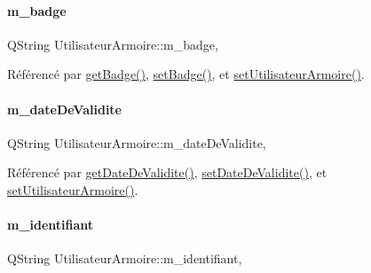 \paragraph{\texorpdfstring{m\+\_\+badge}{m\_badge}}
{\footnotesize\ttfamily Q\+String Utilisateur\+Armoire\+::m\+\_\+badge\hspace{0.3cm}{\ttfamily [read]}, {\ttfamily [write]}}



Référencé par \hyperlink{class_utilisateur_armoire_a22e301861ac1c932d47727ae02a17181}{get\+Badge()}, \hyperlink{class_utilisateur_armoire_afee7add8e43ae142c815f0d14491b01e}{set\+Badge()}, et \hyperlink{class_utilisateur_armoire_a523423ac9e15b8260ca7f5ffc84c008d}{set\+Utilisateur\+Armoire()}.

\mbox{\label{class_utilisateur_armoire_a51bd81c78d69ea2699373d820bae31e4}} 
\paragraph{\texorpdfstring{m\+\_\+date\+De\+Validite}{m\_dateDeValidite}}
{\footnotesize\ttfamily Q\+String Utilisateur\+Armoire\+::m\+\_\+date\+De\+Validite\hspace{0.3cm}{\ttfamily [read]}, {\ttfamily [write]}}



Référencé par \hyperlink{class_utilisateur_armoire_a83c5fad292be7c94e38fc14a5feeae7f}{get\+Date\+De\+Validite()}, \hyperlink{class_utilisateur_armoire_abe51b503b17f3d90c7ebe0546ed39cc0}{set\+Date\+De\+Validite()}, et \hyperlink{class_utilisateur_armoire_a523423ac9e15b8260ca7f5ffc84c008d}{set\+Utilisateur\+Armoire()}.

\mbox{\label{class_utilisateur_armoire_a30cb02e16dd9085a70c6b436781bb756}} 
\paragraph{\texorpdfstring{m\+\_\+identifiant}{m\_identifiant}}
{\footnotesize\ttfamily Q\+String Utilisateur\+Armoire\+::m\+\_\+identifiant\hspace{0.3cm}{\ttfamily [read]}, {\ttfamily [write]}}



